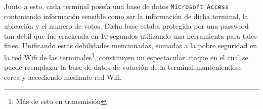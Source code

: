 Junto a esto, cada terminal poseía una base de datos \texttt{Microsoft Access} conteniendo información sensible como ser la información de dicha terminal, la ubicación y el numero de votos. Dicha base estaba protegida por una password tan debil que fue crackeada en 10 segundos utilizando una herramienta para tales fines.
Unificando estas debilidades mencionadas, sumadas a la pobre seguridad en la red Wifi de las terminales\footnote{Más de esto en transmisión}, constituyen un espectacular ataque en el cual se puede reemplazar la base de datos de votación de la terminal manteniendose cerca y accediendo mediante red Wifi\cite{schneier}.





